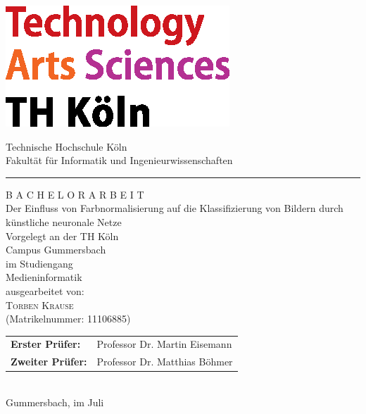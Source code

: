 \documentclass[a4paper,12pt,oneside]{article}
\begin{document}
  
  \newpage
  
  \pagestyle{empty}
  \begin{titlepage}
    \includegraphics[scale=1.00]{Sources/logo_TH-Koeln_CMYK_22pt}\\
    \begin{center}
      \Large
      Technische Hochschule Köln\\
      Fakultät für Informatik und Ingenieurwissenschaften\\
      \hrule\par\rule{0pt}{2cm} %
      \LARGE
      \textsc{B A C H E L O R A R B E I T}\\
      \vspace{1cm} %
      \huge
      Der Einfluss von Farbnormalisierung auf die Klassifizierung von Bildern durch künstliche neuronale Netze\\
      \Large
      \vspace{1 cm}
      \large
      Vorgelegt an der TH Köln\\
      Campus Gummersbach\\
      im Studiengang\\
      Medieninformatik\\ 
      \vspace{1.0cm}
      ausgearbeitet von:\\
      \textsc{Torben Krause}\\
      (Matrikelnummer: 11106885)\\
      \vspace{1.5cm}
      \begin{tabular}{ll} %
          \textbf{Erster Prüfer:} & Professor Dr. Martin Eisemann \\
          \textbf{Zweiter Prüfer:} & Professor Dr. Matthias Böhmer \\
      \end{tabular}
      \vspace{1.5cm}
      \\Gummersbach, im Juli
    \end{center}    
  \end{titlepage}
  
\end{document}
